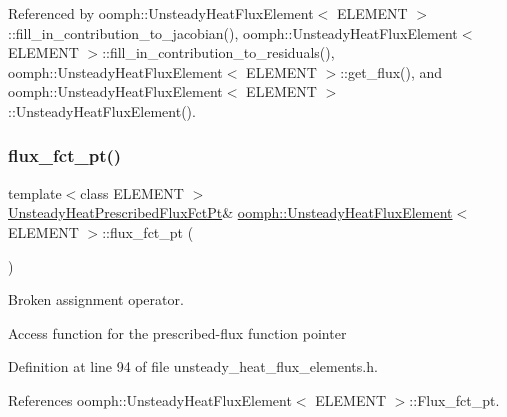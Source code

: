 Referenced by oomph\+::\+Unsteady\+Heat\+Flux\+Element$<$ E\+L\+E\+M\+E\+N\+T $>$\+::fill\+\_\+in\+\_\+contribution\+\_\+to\+\_\+jacobian(), oomph\+::\+Unsteady\+Heat\+Flux\+Element$<$ E\+L\+E\+M\+E\+N\+T $>$\+::fill\+\_\+in\+\_\+contribution\+\_\+to\+\_\+residuals(), oomph\+::\+Unsteady\+Heat\+Flux\+Element$<$ E\+L\+E\+M\+E\+N\+T $>$\+::get\+\_\+flux(), and oomph\+::\+Unsteady\+Heat\+Flux\+Element$<$ E\+L\+E\+M\+E\+N\+T $>$\+::\+Unsteady\+Heat\+Flux\+Element().

\mbox{\label{classoomph_1_1UnsteadyHeatFluxElement_a8e1f2f3ef05006ff79bbe6e4795c80e9}} 
\subsubsection{\texorpdfstring{flux\+\_\+fct\+\_\+pt()}{flux\_fct\_pt()}}
{\footnotesize\ttfamily template$<$class E\+L\+E\+M\+E\+NT $>$ \\
\hyperlink{classoomph_1_1UnsteadyHeatFluxElement_ab60a211e1cee492be6c9b93d6aa36883}{Unsteady\+Heat\+Prescribed\+Flux\+Fct\+Pt}\& \hyperlink{classoomph_1_1UnsteadyHeatFluxElement}{oomph\+::\+Unsteady\+Heat\+Flux\+Element}$<$ E\+L\+E\+M\+E\+NT $>$\+::flux\+\_\+fct\+\_\+pt (\begin{DoxyParamCaption}{ }\end{DoxyParamCaption})\hspace{0.3cm}{\ttfamily [inline]}}



Broken assignment operator. 

Access function for the prescribed-\/flux function pointer 

Definition at line 94 of file unsteady\+\_\+heat\+\_\+flux\+\_\+elements.\+h.



References oomph\+::\+Unsteady\+Heat\+Flux\+Element$<$ E\+L\+E\+M\+E\+N\+T $>$\+::\+Flux\+\_\+fct\+\_\+pt.

\mbox{\label{classoomph_1_1UnsteadyHeatFluxElement_a3d15dd6c50e869f72a228ed8bc26147e}} 
